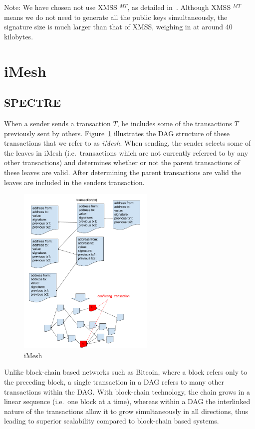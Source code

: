 \documentclass[a4paper,10pt,twocolumn]{article}
\begin{document}
Note: We have chosen not use XMSS \(^{MT}\), as detailed in~\cite{ietf}. Although XMSS \(^{MT}\) means we do not need to generate all 
the public keys simultaneously, the signature size is much larger than that of XMSS, weighing in at around 40 kilobytes.

\section{iMesh}
\label{sec:imesh}

\subsection{SPECTRE}
When a sender sends a transaction \(T\), he includes some of the transactions \(T\) previously sent by others. 
Figure~\ref{fig:imesh} illustrates the DAG structure of these transactions that we refer to as \emph{iMesh}. When sending,
the sender selects some of the leaves in iMesh (i.e.\ transactions which are not currently referred to by any other transactions) and 
determines whether or not the parent transactions of these leaves are valid. After determining the parent transactions are valid the 
leaves are included in the senders transaction.

\begin{figure}[ht]
	\begin{center}
	\includegraphics[width=65mm]{dag.png}
	  \caption{iMesh}
    \label{fig:imesh}
	\end{center}
 \end{figure}

Unlike block-chain based networks such as Bitcoin, where a block refers only to the preceding block, a single transaction in a DAG 
refers to many other transactions within the DAG\@. With block-chain technology, the chain grows in a linear sequence (i.e.\ one block at a 
time), whereas within a DAG the interlinked nature of the transactions allow it to grow simultaneously in all directions, thus leading 
to superior scalability compared to block-chain based systems.
\end{document}
